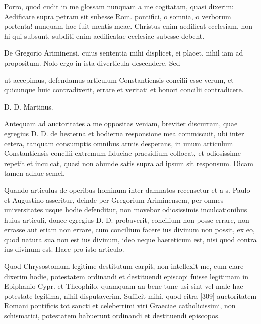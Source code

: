 Porro, quod cudit in me glossam nunquam a me cogitatam, quasi dixerim: Aedificare supra petram sit subesse Rom. pontifici, o somnia, o verborum portenta! nunquam hoc fuit mentis meae. Christus enim aedificat ecclesiam, non hi qui subsunt, subditi enim aedificatae ecclesiae subesse debent.

De Gregorio Ariminensi, cuius sententia mihi displicet, ei placet, nihil iam ad propositum. Nolo ergo in ista diverticula descendere. Sed

ut accepimus, defendamus articulum Constantiensis concilii esse verum, et quicunque huic contradixerit, errare et veritati et honori concilii contradicere.

D. D. Martinus.

Antequam ad auctoritates a me oppositas veniam, breviter discurram, quae egregius D. D. de hesterna et hodierna responsione mea commiscuit, ubi inter cetera, tanquam consumptis omnibus armis desperans, in unum articulum Constantiensis concilii extremum fiduciae praesidium collocat, et odiosissime repetit et inculcat, quasi non abunde satis supra ad ipsum sit responsum. Dicam tamen adhuc semel.

Quando articulus de operibus hominum inter damnatos recensetur et a s. Paulo et Augustino asseritur, deinde per Gregorium Ariminensem, per omnes universitates usque hodie defenditur, non movebor odiosissimis inculcationibus huius articuli, donec egregius D. D. probaverit, concilium non posse errare, non errasse aut etiam non errare, cum concilium facere ius divinum non possit, ex eo, quod natura sua non est ius divinum, ideo neque haereticum est, nisi quod contra ius divinum est. Haec pro isto articulo.

Quod Chrysostomum legitime destitutum carpit, non intellexit me, cum clare dixerim hodie, potestatem ordinandi et destituendi episcopi fuisse legitimam in Epiphanio Cypr. et Theophilo, quamquam an bene tunc usi sint vel male hac potestate legitima, nihil disputaverim. Sufficit mihi, quod citra [309] auctoritatem Romani pontificis tot sancti et celeberrimi viri Graeciae catholicissimi, non schismatici, potestatem habuerunt ordinandi et destituendi episcopos.

